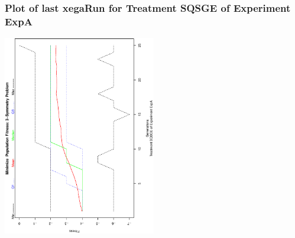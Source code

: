  \begin{frame}
 \frametitle{ Plot of last xegaRun for Treatment SQSGE of Experiment ExpA }
 \begin{center}
\includegraphics[width=0.5\textwidth, angle=-90]
{ExpAPlotPopStatsFigure003.eps}
 \end{center}
 \label{report/ExpAPlotPopStatsFigure003.eps}  
 \end{frame}


